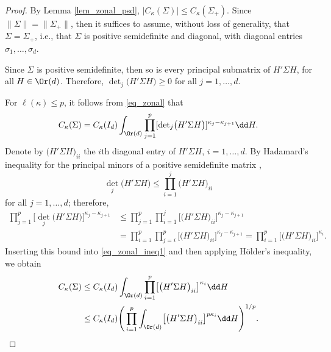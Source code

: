 \begin{proof}
By Lemma \ref{lem_zonal_psd}, $|C_\kappa(\Sigma)| \le C_\kappa(\Sigma_+)$. Since $\|\Sigma\| = \|\Sigma_+\|$, then it suffices to assume, without loss of generality, that $\Sigma = \Sigma_+$, i.e., that $\Sigma$ is positive semidefinite and diagonal, with diagonal entries $\sigma_1,\ldots,\sigma_d$.

Since $\Sigma$ is positive semidefinite, then so is every principal submatrix of $H'\Sigma H$, for all ${H \in \Or(d)}$. Therefore, ${\det}_j\bigl(H'\Sigma H\bigr) \ge 0$ for all $j=1,\ldots,d$.

For $\ell(\kappa) \le p$, it follows from \eqref{eq_zonal} that
\begin{equation}
\label{eq_zonal_ineq1}
C_\kappa(\Sigma) = C_\kappa(I_d) \int_{\Or(d)} \prod_{j=1}^p [{\det}_j\bigl(H'\Sigma H\bigr)]^{\kappa_j-\kappa_{j+1}} \dd H.
\end{equation}
Denote by $\bigl(H'\Sigma H\bigr)_{ii}$ the $i$th diagonal entry of $H'\Sigma H$, $i=1,\ldots,d$. By Hadamard's inequality for the principal minors of a positive semidefinite matrix \cite[p.~505]{Horn},
\[
{\det}_j\bigl(H'\Sigma H\bigr) \le \prod_{i=1}^j \bigl(H'\Sigma H\bigr)_{ii}
\]
for all $j=1,\ldots,d$; therefore,
\begin{align*}
\prod_{j=1}^p \bigl[{\det}_j\bigl(H'\Sigma H\bigr)\bigr]^{\kappa_j-\kappa_{j+1}} &\le \prod_{j=1}^p \prod_{i=1}^j \bigl[\bigl(H'\Sigma H\bigr)_{ii}\bigr]^{\kappa_j-\kappa_{j+1}} \\
&= \prod_{i=1}^p \prod_{j=i}^p \bigl[\bigl(H'\Sigma H\bigr)_{ii}\bigr]^{\kappa_j-\kappa_{j+1}}
= \prod_{i=1}^p \bigl[\bigl(H'\Sigma H\bigr)_{ii}\bigr]^{\kappa_i}.
\end{align*}
Inserting this bound into \eqref{eq_zonal_ineq1} and then applying H\"older's inequality, we obtain
\begin{align}
C_\kappa(\Sigma) &\le C_\kappa(I_d) \int_{\Or(d)} \prod_{i=1}^p \bigl[\bigl(H'\Sigma H\bigr)_{ii}\bigr]^{\kappa_i} \dd H \nonumber \\
&\le C_\kappa(I_d) \Bigg(\prod_{i=1}^p \int_{\Or(d)} \bigl[\bigl(H'\Sigma H\bigr)_{ii}\bigr]^{p \kappa_i} \dd H\Bigg)^{1/p}.\label{eq_zonal_Holder}
\end{align}


\end{proof}
